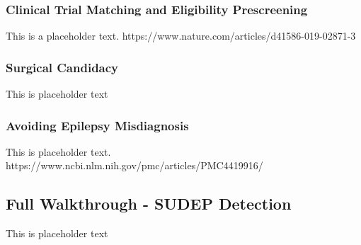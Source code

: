 \subsubsection{Clinical Trial Matching and Eligibility Prescreening}

This is a placeholder text. https://www.nature.com/articles/d41586-019-02871-3

\subsubsection{Surgical Candidacy}

This is placeholder text

\subsubsection{Avoiding Epilepsy Misdiagnosis}

This is placeholder text. https://www.ncbi.nlm.nih.gov/pmc/articles/PMC4419916/

\subsection{Full Walkthrough - SUDEP Detection}

This is placeholder text



